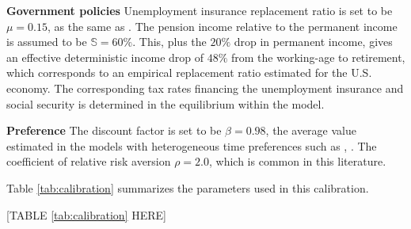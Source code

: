 \textbf{Government policies} Unemployment insurance replacement ratio is set to be $\mu=0.15$, as the same as \cite{krueger2016macroeconomics}.  
The pension income relative to the permanent income is assumed to be $\mathbb{S}=60\%$. This, plus the $ 20\%$ drop in permanent income, gives an effective deterministic income drop of $48\%$ from the working-age to retirement, which corresponds to an empirical replacement ratio estimated for the U.S. economy. The corresponding tax rates financing the unemployment insurance and social security is determined in the equilibrium within the model. 

\textbf{Preference} The discount factor is set to be $\beta=0.98$, the average value estimated in the models with heterogeneous time preferences such as \cite{carroll2017distribution}, \cite{krueger2016macroeconomics}. The coefficient of relative risk aversion $\rho=2.0$, which is common in this literature. 

Table \ref{tab:calibration} summarizes the parameters used in this calibration. 

\begin{center}
[TABLE \ref{tab:calibration} HERE]
\end{center}